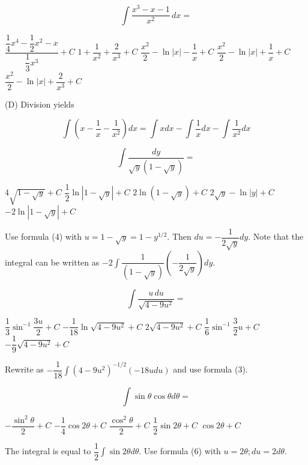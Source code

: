 \newpage


\question
\[
\displaystyle\int \dfrac{x^{3}-x-1}{x^{2}} \,dx=
\]
\begin{choices}
  \choice $\dfrac{\dfrac{1}{4} x^{4}-\dfrac{1}{2} x^{2}-x}{\dfrac{1}{3} x^{3}}+C$
  \choice $1+\dfrac{1}{x^{2}}+\dfrac{2}{x^{3}}+C$
  \choice $\dfrac{x^{2}}{2}-\ln |x|-\dfrac{1}{x}+C$
  \CorrectChoice $\dfrac{x^{2}}{2}-\ln |x|+\dfrac{1}{x}+C$
  \choice $\dfrac{x^{2}}{2}-\ln |x|+\dfrac{2}{x^{3}}+C$
\end{choices}
\begin{solution}
(D) Division yields

\[
\displaystyle\int\left(x-\dfrac{1}{x}-\dfrac{1}{x^{2}}\right) d x=\displaystyle\int x d x-\displaystyle\int \dfrac{1}{x} d x-\displaystyle\int \dfrac{1}{x^{2}} d x
\]
\end{solution}

\question
\[
\displaystyle\int \dfrac{d y}{\sqrt{y}(1-\sqrt{y})}=
\]
\begin{choices}
  \choice $4 \sqrt{1-\sqrt{y}}+C$
  \choice $\dfrac{1}{2} \ln |1-\sqrt{y}|+C$
  \choice $2 \ln (1-\sqrt{y})+C$
  \choice $2 \sqrt{y}-\ln |y|+C$
  \CorrectChoice $-2 \ln |1-\sqrt{y}|+C$
\end{choices}
\begin{solution}
Use formula (4) with $u=1-\sqrt{y}=1-y^{1 / 2}$. Then $d u=-\dfrac{1}{2 \sqrt{y}} d y$. Note that the integral can be written as $-2 \displaystyle\int \dfrac{1}{(1-\sqrt{y})}\left(-\dfrac{1}{2 \sqrt{y}}\right) d y$.
\end{solution}




\newpage


\question
\[
\displaystyle\int \dfrac{u \,du}{\sqrt{4-9 u^{2}}}=
\]
\begin{choices}
  \choice $\dfrac{1}{3} \sin ^{-1} \dfrac{3 u}{2}+C$
  \choice $-\dfrac{1}{18} \ln \sqrt{4-9 u^{2}}+C$
  \choice $2 \sqrt{4-9 u^{2}}+C$
  \choice $\dfrac{1}{6} \sin ^{-1} \dfrac{3}{2} u+C$
  \CorrectChoice $-\dfrac{1}{9} \sqrt{4-9 u^{2}}+C$
\end{choices}
\begin{solution}
Rewrite as $-\dfrac{1}{18} \displaystyle\int\left(4-9 u^{2}\right)^{-1 / 2}(-18 u d u)$ and use formula (3).
\end{solution}

\question\label{calc05:sin-theta-cos}
\[
\displaystyle\int \sin \theta \cos \theta d \theta=
\]
\begin{choices}
  \choice $-\dfrac{\sin ^{2} \theta}{2}+C$
  \CorrectChoice $-\dfrac{1}{4} \cos 2 \theta+C$
  \choice $\dfrac{\cos ^{2} \theta}{2}+C$
  \choice $\dfrac{1}{2} \sin 2 \theta+C$
  \choice $\cos 2 \theta+C$
\end{choices}
\begin{solution}
The integral is equal to $\dfrac{1}{2} \displaystyle\int \sin 2 \theta d \theta$. Use formula (6) with $u=2 \theta ; d u=2 d \theta$.
\end{solution}

